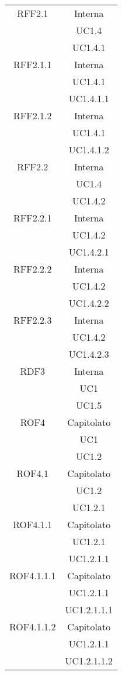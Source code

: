 \begin{longtable}{|c|c|}
\midrule
RFF2.1
& Interna\\
& UC1.4\\
& UC1.4.1\\

\midrule
RFF2.1.1
& Interna\\
& UC1.4.1\\
& UC1.4.1.1\\

\midrule
RFF2.1.2
& Interna\\
& UC1.4.1\\
& UC1.4.1.2\\

\midrule
RFF2.2
& Interna\\
& UC1.4\\
& UC1.4.2\\

\midrule
RFF2.2.1
& Interna\\
& UC1.4.2\\
& UC1.4.2.1\\

\midrule
RFF2.2.2
& Interna\\
& UC1.4.2\\
& UC1.4.2.2\\

\midrule
RFF2.2.3
& Interna\\
& UC1.4.2\\
& UC1.4.2.3\\

\midrule
RDF3
& Interna\\
& UC1\\
& UC1.5\\

\midrule
ROF4
& Capitolato\\
& UC1\\
& UC1.2\\

\midrule
ROF4.1
& Capitolato\\
& UC1.2\\
& UC1.2.1\\

\midrule
ROF4.1.1
& Capitolato\\
& UC1.2.1\\
& UC1.2.1.1\\

\midrule
ROF4.1.1.1
& Capitolato\\
& UC1.2.1.1\\
& UC1.2.1.1.1\\

\midrule
ROF4.1.1.2
& Capitolato\\
& UC1.2.1.1\\
& UC1.2.1.1.2\\


\end{longtable}
